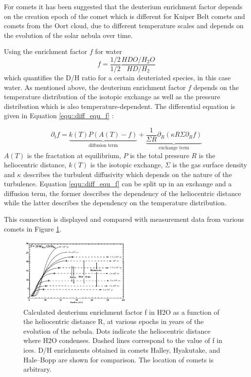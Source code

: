 For comets it has been suggested that the deuterium enrichment factor depends on the creation epoch of the comet which is different for Kuiper Belt comets and comets from the Oort cloud, due to different temperature scales and depends on the evolution of the solar nebula over time. 

Using the enrichment factor $f$ for water
\begin{equation}
	f = \frac{1/2}{1/2} \frac{HDO/H_2O}{HD/H_2}
\end{equation}
which quantifies the D/H ratio for a certain deuteriated species, in this case water. As mentioned above, the deuterium enrichment factor $f$ depends on the temperature distribution of the isotopic exchange as well as the pressure distribution which is also temperature-dependent. The differential equation is given in Equation \ref{equ::diff_equ_f} \cite{transport_solar_nebula}:

\begin{equation}
	\partial_t f = \underbrace{k(T) P(A(T) - f)}_{\textrm{diffusion term}} + \underbrace{\frac{1}{\Sigma R} \partial_R (\kappa R \Sigma\partial_R f)}_{\textrm{exchange term}}
	\label{equ::diff_equ_f}
\end{equation}
$A(T)$ is the fractation at equilibrium, $P$ is the total pressure $R$ is the heliocentric distance, $k(T)$ is the isotopic exchange, $\Sigma$ is the gas surface density and $\kappa$ describes the turbulent diffusivity which depends on the nature of the turbulence. Equation \ref{equ::diff_equ_f} can be split up in an exchange and a diffusion term, the former describes the dependency of the heliocentric distance while the latter describes the dependency on the temperature distribution.

This connection is displayed and compared with measurement data from various comets in Figure \ref{fig::D/H_distance_age}.

\begin{figure}
	\centering
	\includegraphics[width=0.5\textwidth]{figures/D_H_distance_time}
	\caption{Calculated deuterium enrichment factor f in H2O as a function of the heliocentric distance R, at various epochs in years of the evolution of the nebula. Dots indicate the heliocentric distance where H2O condenses. Dashed lines correspond to the value of f in ices. D/H enrichments obtained in comets Halley, Hyakutake, and Hale–Bopp are shown for comparison. The location of comets is arbitrary.  \cite{constraints_comets_dhratio}}
	\label{fig::D/H_distance_age}
\end{figure}


